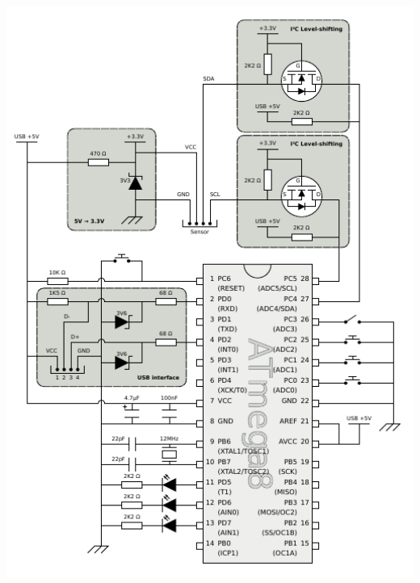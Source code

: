 \documentclass{beamer}
\begin{document}
\begin{frame}[plain, label=circuito-portrait]
	\begin{center}
		\includegraphics[keepaspectratio, width=1.0\textwidth, height=1.0\textheight, clip, trim=0.00in 0.10in 0.00in 0.10in]{../monografia/img/AVR-magnetometer-usb-mouse.pdf}
	\end{center}
\end{frame}
\end{document}
